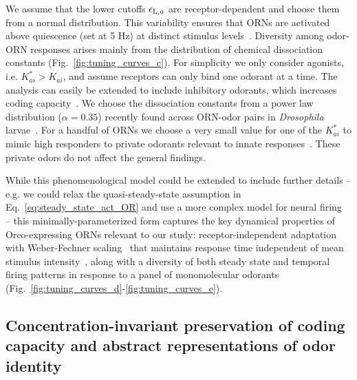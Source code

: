 \documentclass[9pt,twocolumn,twoside]{pnas-new}
\begin{document}
We assume that the lower cutoffs $\epsilon_{\textup{L}, a}$ are receptor-dependent and choose them from a normal distribution. This variability ensures that ORNs are activated above quiescence (set at 5 Hz) at distinct stimulus levels~\cite{srinivas_elife, martelli}. Diversity among odor-ORN responses arises mainly from the distribution of chemical dissociation constants (Fig.~\ref{fig:tuning_curves_c}). For simplicity we only consider agonists, i.e. $K^*_{ai}>K_{ai}$, and assume receptors can only bind one odorant at a time. The analysis can easily be extended to include inhibitory odorants, which increases coding capacity~\cite{Cao_Tu_WL}. We choose the dissociation constants from a power law distribution ($\alpha = 0.35$) recently found across ORN-odor pairs in \textit{Drosophila} larvae~\cite{si2017invariances}. For a handful of ORNs we choose a very small value for one of the $K^*_{ai}$ to mimic high responders to private odorants relevant to innate responses~\cite{geosmin}. These private odors do not affect the general findings. 
 
While this phenomenological model could be extended to include further details -- e.g. we could relax the quasi-steady-state assumption in Eq.~\ref{eq:steady_state_act_OR} and use a more complex model for neural firing~\cite{srinivas_elife} -- this minimally-parameterized form captures the key dynamical properties of Orco-expressing ORNs relevant to our study: receptor-independent adaptation~\cite{nagel_wilson_biophysical} with Weber-Fechner scaling~\cite{srinivas_elife,cafaro_WL,cao_WL} that maintains response time independent of mean stimulus intensity~\cite{martelli,srinivas_elife}, along with a diversity of both steady state and temporal firing patterns in response to a panel of monomolecular odorants~\cite{hallem_carlson,montague2011similar,stopfer_nat_neuro,stopfer_temporal_channel,stopfer_temporal_model} (Fig.~\ref{fig:tuning_curves_d}-\ref{fig:tuning_curves_e}). 








\subsection*{Concentration-invariant preservation of coding capacity and abstract representations of odor identity}
\end{document}
